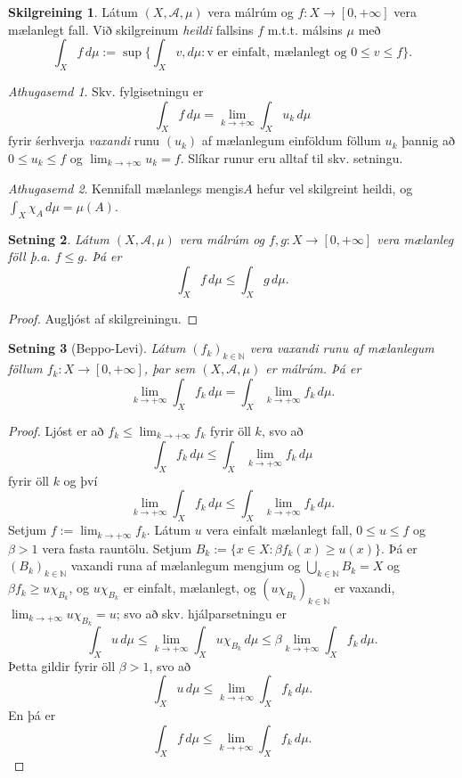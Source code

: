 \documentclass[a4paper,icelandic,11pt]{book}
\theoremstyle{plain}      \newtheorem{setn}{Setning}[chapter]
\theoremstyle{definition} \newtheorem{skilgr}[setn]{Skilgreining}
\theoremstyle{remark}     \newtheorem*{ath}{Athugasemd}
\newcommand{\N}{\mathbb N}
\begin{document}
\begin{skilgr}
  Látum $(X,\mathcal A,\mu)$ vera málrúm og $f:X\to[0,+\infty]$ vera
  mælanlegt fall. Við skilgreinum \emph{heildi} fallsins
  $f$ m.t.t. málsins $\mu$ með
  \[
  \int_{X} f\, d\mu
  := \sup \{ \int_{X} v,d\mu : \text{v er einfalt, mælanlegt og }
  0 \le v \le f \}.
  \]
\end{skilgr}
\begin{ath}
  Skv. fylgisetningu er
  \[
  \int_{X} f\, d\mu = \lim_{k\to+\infty} \int_{X} u_{k}\,d\mu
  \]
  fyrir śerhverja \emph{vaxandi} runu $(u_{k})$ af mælanlegum
  einföldum föllum $u_{k}$ þannig að $0\le u_{k}\le f$ og
  $\lim_{k\to+\infty}u_{k}=f$. Slíkar runur eru alltaf til
  skv. setningu.
\end{ath}
\begin{ath}
  Kennifall mælanlegs mengis$A$ hefur vel skilgreint heildi, og
  $\int_{X}\chi_{A}\,d\mu=\mu(A)$.
\end{ath}
\begin{setn}
  Látum $(X,\mathcal A,\mu)$ vera málrúm og $f,g:X\to[0,+\infty]$ vera
  mælanleg föll þ.a. $f\le g$. Þá er
  \[
  \int_{X}f\,d\mu \le \int_{X}g\,d\mu.
  \]
\end{setn}
\begin{proof}
  Augljóst af skilgreiningu.
\end{proof}
\begin{setn}[Beppo-Levi]
  Látum $(f_{k})_{k\in\N}$ vera \emph{vaxandi} runu af mælanlegum
  föllum $f_{k}:X\to[0,+\infty]$, þar sem $(X,\mathcal{A},\mu)$ er
  málrúm. Þá er
  \[
  \lim_{k\to+\infty}\int_{X} f_{k}\,d\mu
  = \int_{X}\lim_{k\to+\infty}f_{k}\,d\mu.
  \]
\end{setn}
\begin{proof}
  Ljóst er að $f_{k}\le\lim_{k\to+\infty}f_{k}$ fyrir öll $k$, svo að
  \[
  \int_{X}f_{k}\,d\mu
  \le\int_{X}\lim_{k\to+\infty}f_{k}\,d\mu
  \]
  fyrir öll $k$ og því
  \[
  \lim_{k\to+\infty}\int_{X}f_{k}\,d\mu
  \le \int_{X}\lim_{k\to+\infty}f_{k}\,d\mu.
  \]
  Setjum $f:=\lim_{k\to+\infty}f_{k}$. Látum $u$ vera einfalt
  mælanlegt fall, $0\le u\le f$ og $\beta>1$ vera fasta
  rauntölu. Setjum $B_{k}:=\{x\in X : \beta f_{k}(x)\ge u(x)\}$. Þá er
  $(B_{k})_{k\in\N}$ vaxandi runa af mælanlegum mengjum og
  $\bigcup_{k\in\N}B_{k}=X$ og $\beta f_{k}\ge u\chi_{B_{k}}$, og
  $u\chi_{B_{k}}$ er einfalt, mælanlegt, og $(u\chi_{B_{k}})_{k\in\N}$
  er vaxandi, $\lim_{k\to+\infty}u\chi_{B_{k}}=u$; svo að
  skv. hjálparsetningu er
  \[
  \int_{X}u\,d\mu
  \le\lim_{k\to+\infty}\int_{X}u\chi_{B_{k}}\,d\mu
  \le\beta\lim_{k\to+\infty}\int_{X} f_{k}\,d\mu.
  \]
  Þetta gildir fyrir öll $\beta>1$, svo að
  \[
  \int_{X}u\,d\mu
  \le \lim_{k\to+\infty}\int_{X} f_{k}\,d\mu.
  \]
  En þá er
  \[
  \int_{X}f\,d\mu
  \le \lim_{k\to+\infty}\int_{X}f_k\,d\mu.
  \]
\end{proof}
\end{document}
